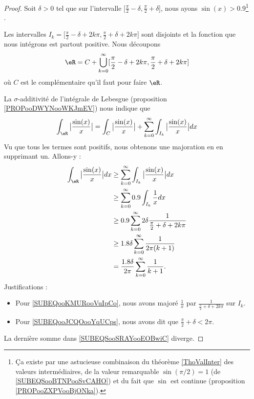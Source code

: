 \begin{proof}
	Soit \( \delta>0\) tel que sur l'intervalle \( \mathopen[ \frac{ \pi }{2}-\delta , \frac{ \pi }{ 2 }+\delta \mathclose]\), nous ayons \( \sin(x)>0.9\)\footnote{Ça existe par une astucieuse combinaison du théorème \ref{ThoValInter} des valeurs intermédiaires, de la valeur remarquable \( \sin(\pi/2)=1\) (de \eqref{SUBEQSooBTNPooSvCAHO}) et du fait que \( \sin\) est continue (proposition \ref{PROPooZXPVooBjONka}).} .

	Les intervalles \( I_k=\mathopen[ \frac{ \pi }{2}-\delta+2k\pi , \frac{ \pi }{2}+\delta+2k\pi \mathclose]\) sont disjoints et la fonction que nous intégrons est partout positive. Nous découpons
	\begin{equation}
		\eR=C+\bigcup_{k=0}^{\infty}\mathopen[ \frac{ \pi }{2}-\delta+2k\pi , \frac{ \pi }{2}+\delta+2k\pi \mathclose]
	\end{equation}
	où \( C\) est le complémentaire qu'il faut pour faire \( \eR\).

	La \( \sigma\)-additivité de l'intégrale de Lebesgue (proposition \ref{PROPooDWYNooWKJmEV}) nous indique que
	\begin{equation}
		\int_{\eR}\big| \frac{ \sin(x) }{ x } \big|= \int_C\big| \frac{ \sin(x) }{ x } \big|+  \sum_{k=0}^{\infty}\int_{I_k}\big| \frac{ \sin(x) }{ x } \big|dx
	\end{equation}
	Vu que tous les termes sont positifs, nous obtenons une majoration en en supprimant un. Allons-y :
	\begin{subequations}        \label{SUBEQSooSRAYooEOBwiC}
		\begin{align}
			\int_{\eR}\big| \frac{ \sin(x) }{ x } \big|dx & \geq \sum_{k=0}^{\infty}\int_{I_k}\big| \frac{ \sin(x) }{ x } \big|dx                                      \\
			                                              & \geq\sum_{k=0}^{\infty}0.9\int_{I_k}\frac{ 1 }{ x }dx                                                      \\
			                                              & \geq 0.9\sum_{k=0}^{\infty}2\delta\frac{1}{ \frac{ \pi }{2}+\delta+2k\pi }     \label{SUBEQooKMURooVuIpCo} \\
			                                              & \geq 1.8\delta\sum_{k=0}^{\infty}\frac{1}{ 2\pi(k+1) }     \label{SUBEQooJCQOooYqUCps}                     \\
			                                              & =\frac{ 1.8\delta }{ 2\pi }\sum_{k=0}^{\infty}\frac{1}{ k+1 }.
		\end{align}
	\end{subequations}
	Justifications :
	\begin{itemize}
		\item Pour \eqref{SUBEQooKMURooVuIpCo}, nous avons majoré \( \frac{1}{ x }\) par \( \frac{1}{ \frac{ \pi }{ 2 }+\delta+2k\pi }\) sur \( I_k\).
		\item Pour \eqref{SUBEQooJCQOooYqUCps}, nous avons dit que \( \frac{ \pi }{2}+\delta<2\pi\).
	\end{itemize}
	La dernière somme dans \eqref{SUBEQSooSRAYooEOBwiC} diverge.


\end{proof}
